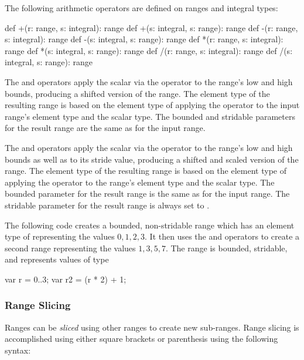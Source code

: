 The following arithmetic operators are defined on ranges and integral
types:

\begin{chapel}
def +(r: range, s: integral): range
def +(s: integral, s: range): range
def -(r: range, s: integral): range
def -(s: integral, s: range): range
def *(r: range, s: integral): range
def *(s: integral, s: range): range
def /(r: range, s: integral): range
def /(s: integral, s: range): range
\end{chapel}

The \chpl{+} and \chpl{-} operators apply the scalar via the operator
to the range's low and high bounds, producing a shifted version of the
range.  The element type of the resulting range is based on the
element type of applying the operator to the input range's element
type and the scalar type.  The bounded and stridable parameters for
the result range are the same as for the input range.

The \chpl{*} and \chpl{/} operators apply the scalar via the operator
to the range's low and high bounds as well as to its stride value,
producing a shifted and scaled version of the range.  The element type
of the resulting range is based on the element type of applying the
operator to the range's element type and the scalar type.  The bounded
parameter for the result range is the same as for the input range.
The stridable parameter for the result range is always set to
.

\begin{example}
The following code creates a bounded, non-stridable range 
which has an element type of  representing the values ${0,
  1, 2, 3}$.  It then uses the \chpl{*} and \chpl{+} operators to
create a second range  representing the values ${1, 3, 5,
  7}$.  The  range is bounded, stridable, and represents
values of type 
\begin{chapel}
var r = 0..3;
var r2 = (r * 2) + 1;
\end{chapel}
\end{example}


\subsubsection{Range Slicing}
\label{Range_Slicing}

Ranges can be \emph{sliced} using other ranges to create new
sub-ranges.  Range slicing is accomplished using either square
brackets or parenthesis using the following syntax:

